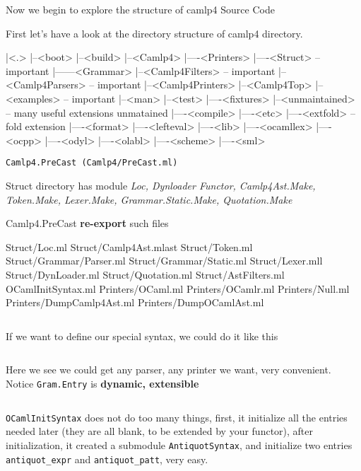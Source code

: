 Now we begin to explore the structure of camlp4 Source Code 

First let's have a look at the directory structure of camlp4 directory.
\begin{bluetext}
|<.>
|--<boot>
|--<build>
|--<Camlp4>
|----<Printers>
|----<Struct>       -- important
|------<Grammar> 
|--<Camlp4Filters>  -- important 
|--<Camlp4Parsers>  -- important 
|--<Camlp4Printers> 
|--<Camlp4Top>
|--<examples>       -- important
|--<man>
|--<test>
|----<fixtures>
|--<unmaintained>   -- many useful extensions unmatained
|----<compile>
|----<etc>
|----<extfold>      -- fold extension 
|----<format>
|----<lefteval>
|----<lib>
|----<ocamllex>
|----<ocpp>
|----<odyl>
|----<olabl>
|----<scheme>
|----<sml>
\end{bluetext}



\verb|Camlp4.PreCast (Camlp4/PreCast.ml)|

Struct directory has module \textit{Loc, Dynloader Functor,
  Camlp4Ast.Make, Token.Make, Lexer.Make, Grammar.Static.Make,
  Quotation.Make}

Camlp4.PreCast \textbf{re-export} such files

    \begin{bluetext}
    Struct/Loc.ml 
    Struct/Camlp4Ast.mlast 
    Struct/Token.ml 
    Struct/Grammar/Parser.ml 
    Struct/Grammar/Static.ml 
    Struct/Lexer.mll 
    Struct/DynLoader.ml 
    Struct/Quotation.ml 
    Struct/AstFilters.ml 
    OCamlInitSyntax.ml 
    Printers/OCaml.ml 
    Printers/OCamlr.ml
    Printers/Null.ml 
    Printers/DumpCamlp4Ast.ml
    Printers/DumpOCamlAst.ml 
    \end{bluetext}


\inputminted[fontsize=\scriptsize, 
             lastline=55]{ocaml}{camlp4/code/PreCast_OCamlInitSyntax.ml}


If we want to define our special syntax, we could do it like this 
\inputminted[fontsize=\scriptsize,]{ocaml}{camlp4/code/my_own_syntax.ml}


Here we see we could get any parser, any printer we want, very convenient.
Notice \verb|Gram.Entry| is \textbf{ dynamic, extensible}

\inputminted[fontsize=\scriptsize,
             firstline=55]{ocaml}{camlp4/code/PreCast_OCamlInitSyntax.ml}
\verb|OCamlInitSyntax| does not do too many things, first, it
initialize all the entries needed later (they are all blank, to be
extended by your functor), after initialization, it created a
submodule \verb|AntiquotSyntax|, and initialize two entries
\verb|antiquot_expr| and \verb|antiquot_patt|, very easy. 

